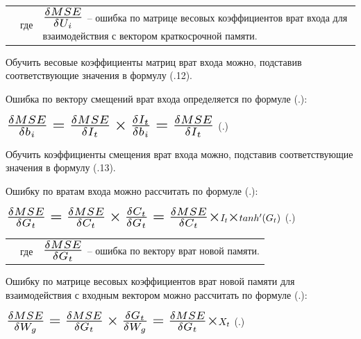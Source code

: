 {  \begin{tabular}{p{}p{}p{}}
		& где  & $\scaleto{\frac{\delta MSE}{\delta U_i}}{21pt}$ {--} ошибка по матрице весовых коэффициентов врат входа для взаимодействия с вектором краткосрочной памяти. \\
  \end{tabular}

  \par \redline Обучить весовые коэффициенты матриц врат входа можно, подставив соответствующие значения в формулу (\thechaptercntr .12).

  \par \redline Ошибка по вектору смещений врат входа определяется по формуле (\thechaptercntr .\theformulacntr): 

  \formulaspace \par \redline 
    $\scaleto{\frac{\delta MSE}{\delta b_i} = \frac{\delta MSE}{\delta I_t} \times \frac{\delta I_t}{\delta b_i} = \frac{\delta MSE}{\delta I_t}}{22pt}$
    \hfill (\thechaptercntr .\theformulacntr) \redline
  \formulaspace \addtocounter{formulacntr}{1}

  \par \redline Обучить коэффициенты смещения врат входа можно, подставив соответствующие значения в формулу (\thechaptercntr .13).

  \par \redline Ошибку по вратам входа можно рассчитать по формуле (\thechaptercntr .\theformulacntr):

  \formulaspace \par \redline 
    $\scaleto{\frac{\delta MSE}{\delta G_t} = \frac{\delta MSE}{\delta C_t} \times \frac{\delta C_t}{\delta G_t} = \frac{\delta MSE}{\delta C_t} \times }{21pt} I_t \scaleto{\times}{10pt} tanh'(G_t)$
    \hfill (\thechaptercntr .\theformulacntr) \redline
  \formulaspace \addtocounter{formulacntr}{1}

  \begin{tabular}{p{}p{}p{}}
    & где  & $\scaleto{\frac{\delta MSE}{\delta G_t}}{21pt}$ {--} ошибка по вектору врат новой памяти. \\
  \end{tabular}

  \par \redline Ошибку по матрице весовых коэффициентов врат новой памяти для взаимодействия с входным вектором можно рассчитать по формуле (\thechaptercntr .\theformulacntr):

  \formulaspace \par \redline 
    $\scaleto{\frac{\delta MSE}{\delta W_g} = \frac{\delta MSE}{\delta G_t} \times \frac{\delta G_t}{\delta W_g} = \frac{\delta MSE}{\delta G_t} \times }{22pt} X_t$
    \hfill (\thechaptercntr .\theformulacntr) \redline
  \formulaspace \addtocounter{formulacntr}{1}

}
